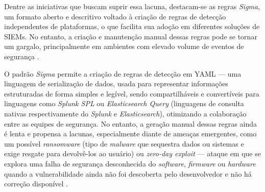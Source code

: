 Dentre as iniciativas que buscam suprir essa lacuna, destacam-se as regras \textit{Sigma}, um formato aberto e descritivo voltado à criação de regras de detecção independentes de plataformas, o que facilita sua adoção em diferentes soluções de SIEMs. 
No entanto, a criação e manutenção manual dessas regras pode se tornar um gargalo, principalmente em ambientes com elevado volume de eventos de segurança \cite{AboutSigma}.

O padrão \textit{Sigma} permite a criação de regras de detecção em YAML --- uma linguagem de serialização de dados, usada para representar informações estruturadas de forma simples e legível, 
sendo compartilháveis e convertíveis para linguagens como \textit{Splunk SPL} ou \textit{Elasticsearch Query} (linguagens de consulta nativas respectivamente do \textit{Splunk} e \textit{Elasticsearch}), 
otimizando a colaboração entre as equipes de segurança. 
No entanto, a geração manual dessas regras ainda é lenta e propensa a lacunas, especialmente diante de ameaças emergentes, como um possível \textit{ransomware} 
(tipo de \textit{malware} que sequestra dados ou sistemas e exige resgate para devolvê-los ao usuário)
ou \textit{zero-day exploit} --- ataque em que se explora uma falha de segurança desconhecida do \textit{software}, \textit{firmware} ou \textit{hardware} quando a vulnerabilidade ainda não foi descoberta pelo desenvolvedor e não há correção disponível \cite{AboutSigma, Exabeam1}.

